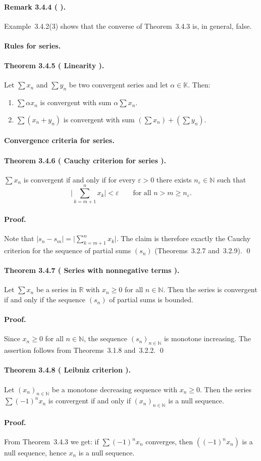 \documentclass[12pt,a4paper]{article}
\newcommand{\N}{\mathbb{N}}
\newcommand{\R}{\mathbb{R}}
\newcommand{\K}{\mathbb{K}} %
\newcommand{\eps}{\varepsilon}
\newcommand{\NumberedTheorem}[3]{%
\paragraph*{Theorem #1 ( #2 ).} #3\par}
\newcommand{\NumberedRemark}[3]{%
\paragraph*{Remark #1 ( #2 ).} #3\par}
\theoremstyle{plain}
\theoremstyle{definition}
\theoremstyle{remark}
\begin{document}
\NumberedRemark{3.4.4}{}{Example~3.4.2(3) shows that the converse of Theorem~3.4.3 is, in general, false.}

\paragraph{Rules for series.}

\NumberedTheorem{3.4.5}{Linearity}{Let $\sum x_n$ and $\sum y_n$ be two convergent series and let $\alpha\in\K$. Then:
\begin{enumerate}[label={(\arabic*)}, leftmargin=*]
	\item $\sum \alpha x_n$ is convergent with sum $\alpha\sum x_n$.
	\item $\sum (x_n+y_n)$ is convergent with sum $(\sum x_n) + (\sum y_n)$.
\end{enumerate}}

\paragraph{Convergence criteria for series.}

\NumberedTheorem{3.4.6}{Cauchy criterion for series}{$\sum x_n$ is convergent if and only if for every $\eps>0$ there exists $n_\eps\in\N$ such that
\[
	\Bigg|\sum_{k=m+1}^{n} x_k\Bigg| < \eps \qquad \text{for all } n>m\ge n_\eps.
\]}
\paragraph{Proof.}
Note that $|s_n-s_m| = \big|\sum_{k=m+1}^{n} x_k\big|$. The claim is therefore exactly the Cauchy criterion for the sequence of partial sums $(s_n)$ (Theorems~3.2.7 and~3.2.9). \qed

\NumberedTheorem{3.4.7}{Series with nonnegative terms}{Let $\sum x_n$ be a series in $\R$ with $x_n\ge0$ for all $n\in\N$. Then the series is convergent if and only if the sequence $(s_n)$ of partial sums is bounded.}
\paragraph{Proof.}
Since $x_n\ge0$ for all $n\in\N$, the sequence $(s_n)_{n\in\N}$ is monotone increasing. The assertion follows from Theorems~3.1.8 and~3.2.2. \qed

\NumberedTheorem{3.4.8}{Leibniz criterion}{Let $(x_n)_{n\in\N}$ be a monotone decreasing sequence with $x_n\ge0$. Then the series $\sum (-1)^n x_n$ is convergent if and only if $(x_n)_{n\in\N}$ is a null sequence.}
\paragraph{Proof.}
From Theorem~3.4.3 we get: if $\sum (-1)^n x_n$ converges, then $((-1)^n x_n)$ is a null sequence, hence $x_n$ is a null sequence.
\end{document}
